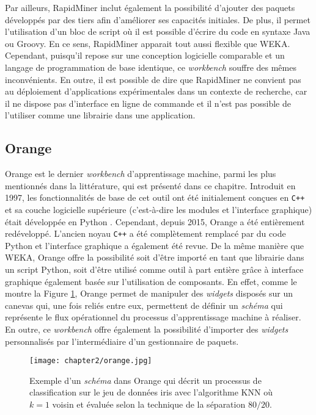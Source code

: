 Par ailleurs, RapidMiner inclut également la possibilité d'ajouter des paquets développés par des tiers afin d'améliorer ses capacités initiales. De plus, il permet l'utilisation d'un bloc de script où il est possible d'écrire du code en syntaxe Java ou Groovy. En ce sens, RapidMiner apparait tout aussi flexible que \acs{WEKA}. Cependant, puisqu'il repose sur une conception logicielle comparable et un langage de programmation de base identique, ce \textit{workbench} souffre des mêmes inconvénients. En outre, il est possible de dire que RapidMiner ne convient pas au déploiement d'applications expérimentales dans un contexte de recherche, car il ne dispose pas d'interface en ligne de commande et il n'est pas possible de l'utiliser comme une librairie dans une application.

\subsection{Orange}

Orange est le dernier \textit{workbench} d'apprentissage machine, parmi les plus mentionnés dans la littérature, qui est présenté dans ce chapitre. Introduit en 1997, les fonctionnalités de base de cet outil ont été initialement conçues en \verb!C++! et sa couche logicielle supérieure (c'est-à-dire les modules et l'interface graphique) était développée en Python \citep{Demsar2004,Demsar2013}. Cependant, depuis 2015, Orange a été entièrement redéveloppé. L'ancien noyau \verb!C++! a été complètement remplacé par du code Python et l'interface graphique a également été revue. De la même manière que \acs{WEKA}, Orange offre la possibilité soit d'être importé en tant que librairie dans un script Python, soit d'être utilisé comme outil à part entière grâce à interface graphique également basée sur l'utilisation de composants. En effet, comme le montre la Figure \ref{fig:orange}, Orange permet de manipuler des \emph{widgets} disposés sur un canevas qui, une fois reliés entre eux, permettent de définir un \emph{schéma} qui représente le flux opérationnel du processus d'apprentissage machine à réaliser. En outre, ce \textit{workbench} offre également la possibilité d'importer des \emph{widgets} personnalisés par l'intermédiaire d'un gestionnaire de paquets.

\begin{figure}[H]
	\centering
	\texttt{[image: chapter2/orange.jpg]}
        \caption{Exemple d'un \emph{schéma} dans Orange qui décrit un processus de classification sur le jeu de données iris avec l'algorithme \acs{KNN} où $k=1$ voisin et évaluée selon la technique de la séparation $80/20$.}
	\label{fig:orange}
\end{figure}


